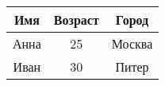 \begin{tabular}{c|c|c|}
\hline
Имя & Возраст & Город \\
\hline
Анна & 25 & Москва \\
\hline
Иван & 30 & Питер \\
\hline
\end{tabular}
